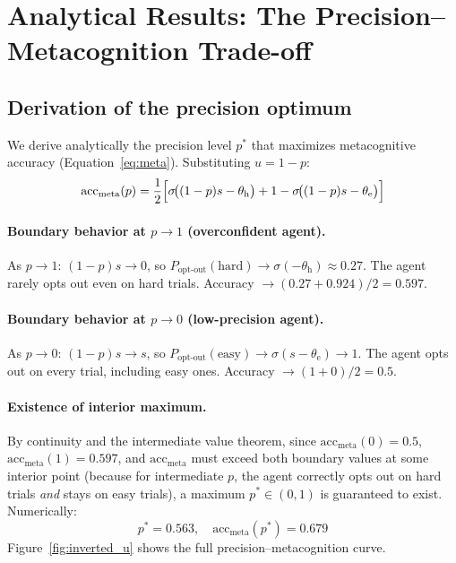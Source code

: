 \documentclass[12pt]{article}
\newcommand{\precision}{p}
\newcommand{\uncertainty}{u}
\newcommand{\optout}{\text{opt-out}}
\newcommand{\poptout}{P_{\optout}}
\newcommand{\metaacc}{\text{acc}_{\text{meta}}}
\newcommand{\sigmoid}{\sigma}
\newcommand{\pstar}{p^*}
\newcommand{\thresh}[1]{\theta_{#1}}
\newcommand{\slope}{s}
\begin{document}
\section{Analytical Results: The Precision--Metacognition Trade-off}
\label{sec:analytical}

\subsection*{Derivation of the precision optimum}

We derive analytically the precision level $\pstar$ that maximizes metacognitive accuracy
(Equation~\ref{eq:meta}). Substituting $\uncertainty = 1 - \precision$:
\begin{equation}
  \metaacc(\precision) = \frac{1}{2}\Bigl[
    \sigmoid\!\bigl((1-\precision)\slope - \thresh{\text{h}}\bigr)
    + 1 - \sigmoid\!\bigl((1-\precision)\slope - \thresh{\text{e}}\bigr)
  \Bigr]
  \label{eq:meta_full}
\end{equation}

\paragraph{Boundary behavior at $\precision \to 1$ (overconfident agent).}
As $\precision \to 1$: $(1-\precision)\slope \to 0$, so
$\poptout(\text{hard}) \to \sigmoid(-\thresh{\text{h}}) \approx 0.27$.
The agent rarely opts out even on hard trials. Accuracy $\to (0.27 + 0.924)/2 = 0.597$.

\paragraph{Boundary behavior at $\precision \to 0$ (low-precision agent).}
As $\precision \to 0$: $(1-\precision)\slope \to \slope$, so
$\poptout(\text{easy}) \to \sigmoid(\slope - \thresh{\text{e}}) \to 1$.
The agent opts out on every trial, including easy ones. Accuracy $\to (1 + 0)/2 = 0.5$.

\paragraph{Existence of interior maximum.}
By continuity and the intermediate value theorem, since $\metaacc(0) = 0.5$,
$\metaacc(1) = 0.597$, and $\metaacc$ must exceed both boundary values at some interior
point (because for intermediate $\precision$, the agent correctly opts out on hard trials
\emph{and} stays on easy trials), a maximum $\pstar \in (0,1)$ is guaranteed to exist.
Numerically:
\begin{equation}
  \boxed{\pstar = 0.563, \quad \metaacc(\pstar) = 0.679}
\end{equation}
Figure~\ref{fig:inverted_u} shows the full precision--metacognition curve.
\end{document}
